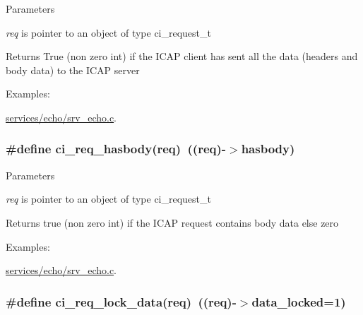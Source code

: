 \begin{DoxyParams}{Parameters}
\item[{\em req}]is pointer to an object of type ci\_\-request\_\-t \end{DoxyParams}
\begin{DoxyReturn}{Returns}
True (non zero int) if the ICAP client has sent all the data (headers and body data) to the ICAP server 
\end{DoxyReturn}
\begin{Desc}
\item[Examples: ]\par
\hyperlink{services_2echo_2srv__echo_8c-example}{services/echo/srv\_\-echo.c}.\end{Desc}
\hypertarget{group__REQUEST_ga880e2efbfecb44754d9eca657a2fc63c}{
\subsubsection[{ci\_\-req\_\-hasbody}]{\setlength{\rightskip}{0pt plus 5cm}\#define ci\_\-req\_\-hasbody(req)~((req)-\/$>$hasbody)}}
\label{group__REQUEST_ga880e2efbfecb44754d9eca657a2fc63c}

\begin{DoxyParams}{Parameters}
\item[{\em req}]is pointer to an object of type ci\_\-request\_\-t \end{DoxyParams}
\begin{DoxyReturn}{Returns}
true (non zero int) if the ICAP request contains body data else zero 
\end{DoxyReturn}
\begin{Desc}
\item[Examples: ]\par
\hyperlink{services_2echo_2srv__echo_8c-example}{services/echo/srv\_\-echo.c}.\end{Desc}
\hypertarget{group__REQUEST_gaf08ade43e662a7290d87fe0111996bcf}{
\subsubsection[{ci\_\-req\_\-lock\_\-data}]{\setlength{\rightskip}{0pt plus 5cm}\#define ci\_\-req\_\-lock\_\-data(req)~((req)-\/$>$data\_\-locked=1)}}
\label{group__REQUEST_gaf08ade43e662a7290d87fe0111996bcf}


